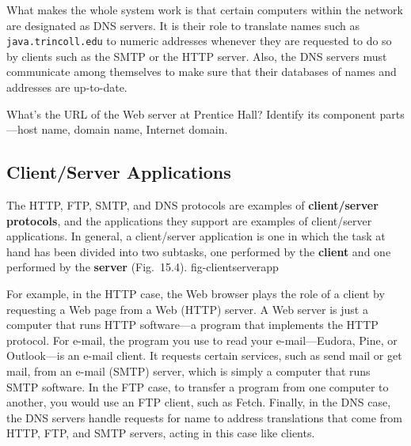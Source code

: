What makes the whole system work is that certain computers within the
network are designated as DNS servers.  It is their role to translate
names such as {\tt java.trincoll.edu} to numeric addresses whenever
they are requested to do so by clients such as the SMTP or the HTTP
server.  Also, the DNS servers must communicate among themselves to
make sure that their databases of names and addresses are up-to-date.

\begin{SSTUDY}

\item  What's the URL of the Web server at Prentice Hall?  Identify its
component parts---host name, domain name, Internet domain.
\end{SSTUDY}

\subsection{Client/Server Applications}
\noindent The HTTP, FTP, SMTP, and DNS protocols are examples of {\bf
client/server protocols}, and the applications they support are
examples of client/server applications.  In general, a client/server
application is one in which the task at hand has been divided into two
subtasks, one performed by the {\bf client} and one performed by the
{\bf server} (Fig.~15.4).
{fig-clientserverapp}


For example, in the HTTP case, the Web browser plays the role of a
client by requesting a Web page from a Web (HTTP) server.  A Web server
is just a computer that runs HTTP software---a program that
implements the HTTP protocol.   For e-mail, the program you use to read
your e-mail---Eudora, Pine, or Outlook---is an e-mail client.  It
requests certain services, such as send mail or get mail, from an
e-mail (SMTP) server, which is simply a computer that runs SMTP
software.  In the FTP case, to transfer a program from one computer to
another, you would use an FTP client, such as Fetch.  Finally, in the
DNS case, the DNS servers handle requests for name to address
translations that come from HTTP, FTP, and SMTP servers, acting in this
case like clients.

